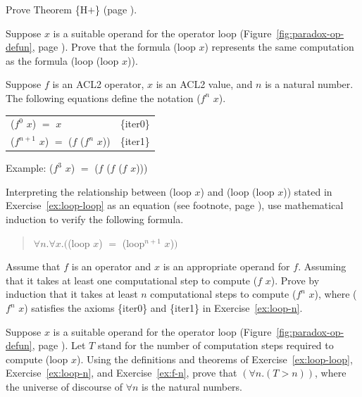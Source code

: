 \begin{ExerciseList}
\Exercise Prove Theorem \{H$+$\} (page \pageref{thm:HplusHminus}).

\Exercise \label{ex:loop-loop}
Suppose $x$ is a suitable operand for the operator loop
(Figure~\ref{fig:paradox-op-defun}, page \pageref{fig:paradox-op-defun}).
Prove that the formula
(loop $x$) represents
the same computation as the formula (loop (loop $x$)).

\Exercise \label{ex:loop-n}
Suppose $f$ is an ACL2 operator, $x$ is an ACL2 value,
and $n$ is a natural number.
The following equations define the notation ($f^n$ $x$).
\begin{center}
\begin{tabular}{ll}
($f^0$ $x$) $=$ $x$                    &\{iter0\} \\
($f^{n+1}$ $x$) $=$ ($f$ ($f^n$ $x$))  &\{iter1\} \\
\end{tabular}
Example: ($f^3$ $x$) $=$ ($f$ ($f$ ($f$ $x$)))
\end{center}
Interpreting the relationship between (loop $x$) and (loop (loop $x$))
stated in Exercise~\ref{ex:loop-loop}
as an equation (see footnote, page \pageref{caveat:equality-for-loop}),
use mathematical induction to verify the following formula.
\begin{quote}
$\forall n.\forall x.($(loop $x$) $=$ (loop$^{n+1}$ $x$)$)$
\end{quote}

\Exercise \label{ex:f-n}
Assume that $f$ is an operator and $x$ is an appropriate operand for $f$.
Assuming that it takes at least one computational step to compute ($f$ $x$).
Prove by induction that it takes at least $n$ computational steps
to compute ($f^n$ $x$), where ($f^n$ $x$) satisfies the axioms
\{iter0\} and \{iter1\} in Exercise~\ref{ex:loop-n}.

\Exercise
Suppose $x$ is a suitable operand for the operator loop
(Figure~\ref{fig:paradox-op-defun}, page \pageref{fig:paradox-op-defun}).
Let $T$ stand for the number of computation steps required to
compute (loop $x$).
Using the definitions and theorems of Exercise~\ref{ex:loop-loop},
Exercise~\ref{ex:loop-n}, and Exercise~\ref{ex:f-n},
prove that $(\forall n.(T > n))$, where the universe of
discourse of $\forall n$ is the natural numbers.

\end{ExerciseList}

